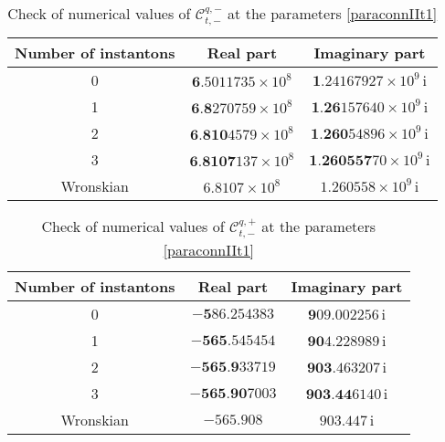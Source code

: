 \documentclass[11pt]{article}
\numberwithin{equation}{section}
\begin{document}
\begin{table}[h]
\centering
 \begin{tabular}{| c | c  c| }
    \hline
     Number of instantons & Real part  & Imaginary part  \\

    \hline   

    0  & $\textbf{6}.5011735\times 10^8$  & $\textbf{1}.24167927\times 10^9$\,i  \\
        
    1  & $\textbf{6.8}270759\times 10^8$  & $\textbf{1.26}157640\times 10^9$\,i  \\

    2  & $\textbf{6.810}4579\times 10^8$  & $\textbf{1.260}54896\times 10^9 $\,i \\
    3  & $\textbf{6.8107}137\times 10^8$  & $\textbf{1.260557}70\times 10^9$\,i \\
         \hline
    Wronskian & $6.8107\times 10^8$  &  $1.260558\times 10^9$\,i \\
        \hline
    \end{tabular}
    \caption{Check of numerical values of $\mathcal{C}_{t,-}^{q,-}$ at the parameters \eqref{paraconnIIt1}}
    \label{ttoqpositive1}
\end{table}

\begin{table}[h]
\centering
 \begin{tabular}{| c | c  c| }
    \hline
     Number of instantons & Real part  & Imaginary part  \\

    \hline   

    0  & $-\textbf{5}86.254383$  & $\textbf{9}09.002256$\,i  \\
        
    1  & $-\textbf{565}.545454$  & $\textbf{90}4.228989$\,i  \\

    2  & $-\textbf{565.9}33719$  & $\textbf{903}.463207 $\,i \\
    3  & $-\textbf{565.90}7003$  & $\textbf{903.44}6140$\,i \\
         \hline
    Wronskian & $-565.908$  &  $903.447$\,i \\
        \hline
    \end{tabular}
    \caption{Check of numerical values of $\mathcal{C}_{t,-}^{q,+}$ at the parameters \eqref{paraconnIIt1}}
    \label{ttoqpositive2}
\end{table}
\end{document}
